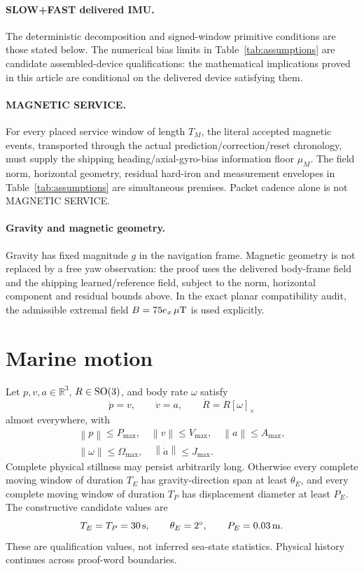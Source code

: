 \documentclass[journal]{IEEEtran}
\newcommand{\R}{\mathbb{R}}\newcommand{\norm}[1]{\left\lVert#1\right\rVert}
\begin{document}
\paragraph{SLOW+FAST delivered IMU.}
The deterministic decomposition and signed-window primitive conditions are
those stated below.  The numerical bias limits in Table~\ref{tab:assumptions}
are candidate assembled-device qualifications: the mathematical implications
proved in this article are conditional on the delivered device satisfying them.

\paragraph{MAGNETIC SERVICE.}
For every placed service window of length $T_M$, the literal accepted magnetic
events, transported through the actual prediction/correction/reset chronology,
must supply the shipping heading/axial-gyro-bias information floor $\mu_M$.
The field norm, horizontal geometry, residual hard-iron and measurement
envelopes in Table~\ref{tab:assumptions} are simultaneous premises.  Packet
cadence alone is not MAGNETIC SERVICE.

\paragraph{Gravity and magnetic geometry.}
Gravity has fixed magnitude $g$ in the navigation frame.  Magnetic geometry is
not replaced by a free yaw observation: the proof uses the delivered body-frame
field and the shipping learned/reference field, subject to the norm, horizontal
component and residual bounds above.  In the exact planar compatibility audit,
the admissible extremal field $B=75e_x\,\mu{\rm T}$ is used explicitly.

\section{Marine motion}
Let \(p,v,a\in\R^3\), \(R\in{\rm SO}(3)\), and body rate \(\omega\) satisfy
\[
\dot p=v,\qquad\dot v=a,\qquad\dot R=R[\omega]_\times
\]
almost everywhere, with
\[
\begin{gathered}
\norm p\le P_{\max},\quad\norm v\le V_{\max},\quad\norm a\le A_{\max},\\
\norm\omega\le\Omega_{\max},\quad\norm{\dot a}\le J_{\max}.
\end{gathered}
\]
Complete physical stillness may persist arbitrarily long. Otherwise every complete moving window of duration \(T_E\) has gravity-direction span at least \(\theta_E\), and every complete moving window of duration \(T_P\) has displacement diameter at least \(P_E\). The constructive candidate values are
\[
T_E=T_P=30\,{\rm s},\qquad \theta_E=2^\circ,\qquad P_E=0.03\,{\rm m}.
\]
These are qualification values, not inferred sea-state statistics. Physical history continues across proof-word boundaries.
\end{document}

